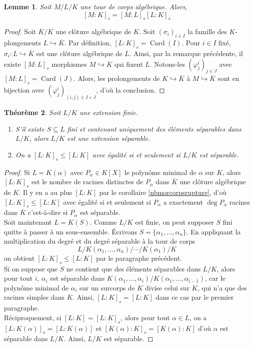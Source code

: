 \documentclass{article}
\DeclareMathOperator{\Card}{Card}
\theoremstyle{plain}
\newtheorem{theorem}{Théorème}[subsection]
\newtheorem{lemma}[theorem]{Lemme}
\theoremstyle{definition}
\theoremstyle{remark}
\begin{document}
\begin{lemma}
    Soit $M/L/K$ une tour de corps algébrique. Alors,
    \[[M : K]_s = [M : L]_s [L : K]_s\]
\end{lemma}

\begin{proof}
    Soit $\overline{K}/K$ une clôture algébrique de $K$. Soit $(\sigma_i)_{i\in I}$ la famille des $K$-plongements $L \hookrightarrow \overline{K}$. Par définition, $[L : K]_s = \Card(I)$. Pour $i\in I$ fixé, $\sigma_i : L \hookrightarrow \overline{K}$ est une clôture algébrique de $L$. Ainsi, par la remarque précédente, il existe $[M : L]_s$ morphismes $M \hookrightarrow \overline{K}$ qui fixent $L$. Notons-les $(\varphi_j^i)_{j \in J}$ avec $[M : L]_s = \Card(J)$. Alors, les prolongements de $K \hookrightarrow \overline{K}$ à $M \hookrightarrow \overline{K}$ sont en bijection avec $(\varphi_j^i)_{(i,j) \in I \times J}$, d'où la conclusion.
\end{proof}

\begin{theorem}
    Soit $L/K$ une extension finie.
    \begin{enumerate}
        \item S'il existe $S \subseteq L$ fini et contenant uniquement des éléments séparables dans $L/K$, alors $L/K$ est une extension séparable. 
        \item On a $[L : K]_s \le [L : K]$ avec égalité si et seulement si $L/K$ est séparable.
    \end{enumerate}
\end{theorem}

\begin{proof}
    Si $L = K(\alpha)$ avec $P_\alpha \in K[X]$ le polynôme minimal de $\alpha$ sur $K$, alors $[L : K]_s$ est le nombre de racines distinctes de $P_\alpha$ dans $\overline{K}$ une clôture algébrique de $K$. Il y en a au plus $[L : K]$ par le corollaire \ref{nbmorcorpsrupture}, d'où $[L : K]_s \le [L : K]$ avec égalité si et seulement si $P_\alpha$ a exactement $\deg P_\alpha$ racines dans $\overline{K}$ c'est-à-dire si $P_\alpha$ est séparable.\\
    Soit maintenant $L = K(S)$. Comme $L/K$ est finie, on peut supposer $S$ fini quitte à passer à un sous-ensemble. Écrivons $S = \{\alpha_1,\dots,\alpha_n\}$. En appliquant la multiplication du degré et du degré séparable à la tour de corps
    \[L/K(\alpha_1,\dots,\alpha_n)/\cdots/K(\alpha_1)/K\]
    on obtient $[L : K]_s \le [L : K]$ par le paragraphe précédent. \\
    Si on suppose que $S$ ne contient que des éléments séparables dans $L/K$, alors pour tout $i$, $\alpha_i$ est séparable dans $K(\alpha_1,\dots,\alpha_i)/K(\alpha_1,\dots,\alpha_{i-1})$, car le polynôme minimal de $\alpha_i$ sur un surcorps de $K$ divise celui sur $K$, qui n'a que des racines simples dans $\overline{K}$. Ainsi, $[L : K]_s = [L : K]$ dans ce cas par le premier paragraphe. \\
    Réciproquement, si $[L : K] = [L : K]_s$, alors pour tout $\alpha \in L$, on a $[L : K(\alpha)]_s = [L : K(\alpha)]$ et $[K(\alpha) : K]_s = [K(\alpha) : K]$ d'où $\alpha$ est séparable dans $L/K$. Ainsi, $L/K$ est séparable.
\end{proof}
\end{document}
